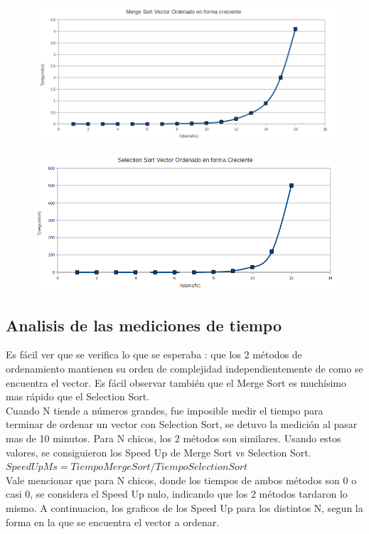 \begin{figure}[!htp]
\begin{center}
\includegraphics[width=12cm]{Imagenes/MergeSortOrdenadocreciente.PNG}
\end{center}
\end{figure} 

\begin{figure}[!htp]
\begin{center}
\includegraphics[width=12cm]{Imagenes/SelectionSortordenadocreciente.PNG}
\end{center}
\end{figure} 

\newpage


\subsection{Analisis de las mediciones de tiempo}
Es fácil ver que se verifica lo que se esperaba : que los 2 métodos de ordenamiento mantienen su orden de complejidad independientemente
de como se encuentra el vector. Es fácil observar también que el Merge Sort es muchísimo mas rápido que el Selection Sort.\\
Cuando N tiende a números grandes, fue imposible medir el tiempo para terminar de ordenar un vector con Selection Sort, se detuvo la medición al pasar mas de 10 minutos. Para N chicos, los 2 métodos son similares.
Usando estos valores, se consiguieron los Speed Up de Merge Sort vs Selection Sort.\\
$SpeedUpMs=TiempoMergeSort/TiempoSelectionSort$\\
Vale mencionar que para N chicos, donde los tiempos de ambos métodos son 0 o casi 0, se considera el Speed Up nulo, indicando que los 2 métodos tardaron lo mismo.
A continuacion, los graficos de los Speed Up para los distintos N, segun la forma en la que se encuentra el vector a ordenar.

